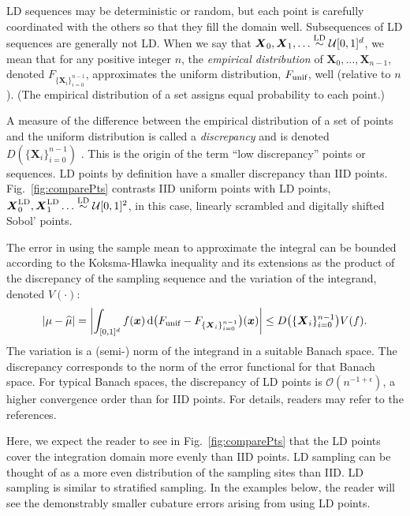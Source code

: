 \documentclass[graybox]{svmult}
\begin{document}
LD sequences may be deterministic or random, but each point is carefully coordinated with the others so that they fill the domain well.  Subsequences of LD sequences are generally not LD.  When we say that $\boldsymbol{X}_0, \boldsymbol{X}_1, \ldots \overset{\textup{LD}}{\sim} \mathcal{U}[0,1]^d$, we mean that for any positive integer $n$,  the \emph{empirical distribution} of $\boldsymbol{X}_0, \ldots, \boldsymbol{X}_{n-1}$, denoted $F_{\{\boldsymbol{X}_i\}_{i=0}^{n-1}}$,  approximates the uniform distribution, $F_{\textup{unif}}$, well (relative to $n$).  (The empirical distribution of a set assigns equal probability to each point.)

A measure of the difference between the empirical distribution of a set of points and the uniform distribution is called a \emph{discrepancy} and is denoted $D(\{\boldsymbol{X}_i\}_{i=0}^{n-1})$ \cite{DicEtal14a,Hic97a,Hic99a,Nie92}.  This is the origin of the term ``low discrepancy'' points or sequences.  LD points by definition have a smaller discrepancy than IID points.  Fig.~\ref{fig:comparePts} contrasts IID uniform points with LD points, $\boldsymbol{X}^{\textup{LD}}_0, \boldsymbol{X}^{\textup{LD}}_1 \ldots \overset{\textup{LD}}{\sim} \mathcal{U}[0,1]^2$, in this case, linearly scrambled and digitally shifted Sobol' points.

The error in using the sample mean to approximate the integral can be bounded according to the Koksma-Hlawka inequality and its extensions \cite{DicEtal14a,Hic97a,Hic99a,Nie92} as the product of the discrepancy of the sampling sequence and the variation of the integrand, denoted $V(\cdot)$:
\begin{equation}
	\lvert\mu - \widehat{\mu}\rvert = \biggl \lvert \int_{[0,1]^d} f(\boldsymbol{x}) \, \mathrm{d} \bigl(F_{\textup{unif}} - F_{\{\boldsymbol{X}_i\}_{i=0}^{n-1}}\bigr) (\boldsymbol{x}) \biggr \rvert \le D\bigl(\{\boldsymbol{X}_i\}_{i=0}^{n-1}\bigr) V(f).
\end{equation} 
The variation is a (semi-) norm of the integrand in a suitable Banach space.  The discrepancy corresponds to the norm of the error functional for that Banach space.  For typical Banach spaces, the discrepancy of LD points is $\mathcal{O}(n^{-1+\epsilon})$, a higher convergence order than for IID points.  For details,  readers may refer to the references.

Here, we expect the reader to see in Fig.~\ref{fig:comparePts} that the LD points cover the integration domain more evenly than IID points.  LD sampling can be thought of as a more even distribution of the sampling sites than IID.  LD sampling is similar to stratified sampling.  In the examples below, the reader will see the demonstrably smaller cubature errors arising from using LD points.
\end{document}
